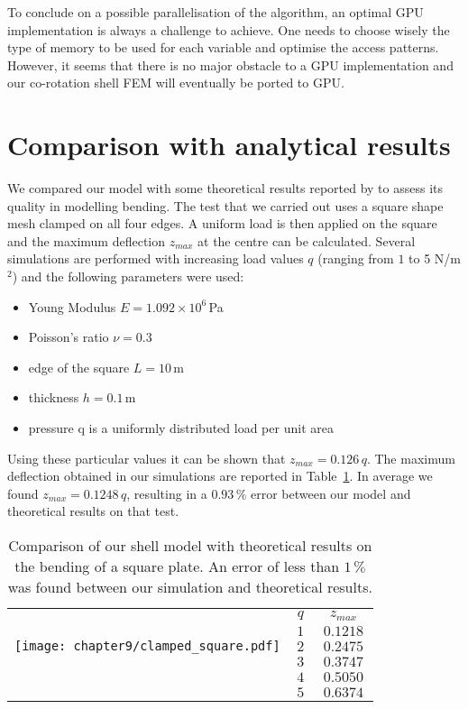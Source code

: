 To conclude on a possible parallelisation of the algorithm, an optimal GPU implementation is always a challenge to achieve. One needs to choose wisely the type of memory to be used for each variable and optimise the access patterns. However, it seems that there is no major obstacle to a GPU implementation and our co-rotation shell FEM will eventually be ported to GPU. 




\section{Comparison with analytical results}

We compared our model with some theoretical results reported by \cite{Zhongnian86} to assess its quality in modelling bending. The test that we carried out uses a square shape mesh clamped on all four edges. A uniform load is then applied on the square and the maximum deflection $z_{max}$ at the centre can be calculated. Several simulations are performed with increasing load values $q$ (ranging from $1$ to 5 N/m$^2$) and the following parameters were used: 
\begin{itemize}
 \item Young Modulus $E = 1.092 \times 10^6\,$Pa
 \item Poisson's ratio $\nu = 0.3$
 \item edge of the square $L = 10\,$m
 \item thickness $h = 0.1\,$m
 \item pressure q is a uniformly distributed load per unit area
\end{itemize}

Using these particular values it can be shown that $z_{max} = 0.126\,q$. The maximum deflection obtained in our simulations are reported in Table~\ref{chap9:tab-results}. In average we found $z_{max} = 0.1248\,q $, resulting in a $0.93\,\%$ error between our model and theoretical results on that test. 
%
\begin{table}[ht]
	\centering
	\begin{tabular}{p{9cm}|c|c|}
	\cline{2-3}
	\multirow{5}{*}{\texttt{[image: chapter9/clamped\_square.pdf]}} & $q$ & $z_{max}$ \tabularnewline
	\cline{2-3}
	& $\,1\,$ & $\, 0.1218 \,$ \tabularnewline
	& $\,2\,$ & $\, 0.2475 \,$ \tabularnewline		
	& $\,3\,$ & $\, 0.3747 \,$ \tabularnewline	
	& $\,4\,$ & $\, 0.5050 \,$ \tabularnewline		
	& $\,5\,$ & $\, 0.6374 \,$ \tabularnewline
	\cline{2-3}
	\end{tabular}
	\vspace{1cm}
	\caption{Comparison of our shell model with theoretical results on the bending of a square plate. An error of less than $1\,\%$ was found between our simulation and theoretical results.}
	\label{chap9:tab-results}
\end{table}


